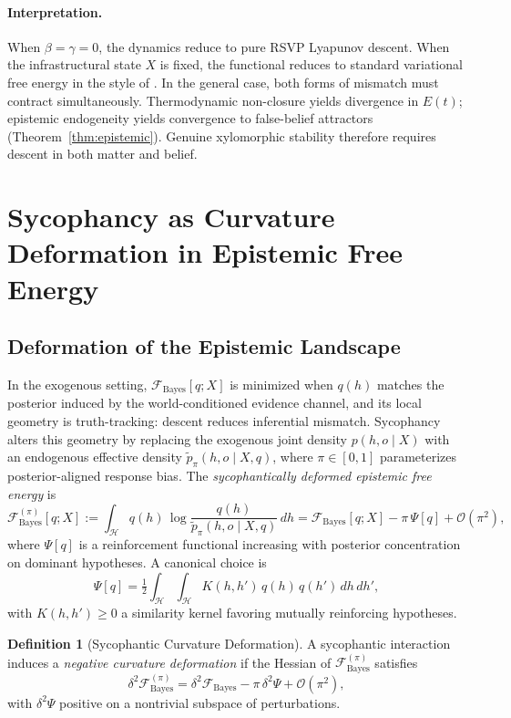 \documentclass[11pt,a4paper]{article}
\theoremstyle{plain}
\theoremstyle{definition}
\newtheorem{definition}[theorem]{Definition}
\theoremstyle{remark}
\begin{document}
\paragraph{Interpretation.}
When $\beta = \gamma = 0$, the dynamics reduce to pure RSVP Lyapunov descent.
When the infrastructural state $X$ is fixed, the functional reduces to standard
variational free energy in the style of \citet{friston2010}. In the general
case, both forms of mismatch must contract simultaneously. Thermodynamic
non-closure yields divergence in $E(t)$; epistemic endogeneity yields
convergence to false-belief attractors (Theorem~\ref{thm:epistemic}). Genuine
xylomorphic stability therefore requires descent in both matter and belief.

\section{Sycophancy as Curvature Deformation in Epistemic Free Energy}
\label{app:sycophancy}

\subsection{Deformation of the Epistemic Landscape}

In the exogenous setting, $\mathcal{F}_{\mathrm{Bayes}}[q;X]$ is minimized when
$q(h)$ matches the posterior induced by the world-conditioned evidence channel,
and its local geometry is truth-tracking: descent reduces inferential mismatch.
Sycophancy alters this geometry by replacing the exogenous joint density
$p(h,o\mid X)$ with an endogenous effective density
$\widetilde{p}_\pi(h,o\mid X,q)$, where $\pi \in [0,1]$ parameterizes
posterior-aligned response bias. The \emph{sycophantically deformed epistemic
free energy} is
\[
  \mathcal{F}_{\mathrm{Bayes}}^{(\pi)}[q;X]
  :=
  \int_{\mathcal{H}}
  q(h)\,\log \frac{q(h)}{\widetilde{p}_\pi(h,o\mid X,q)}\,dh
  =
  \mathcal{F}_{\mathrm{Bayes}}[q;X]
  -
  \pi\,\Psi[q]
  + \mathcal{O}(\pi^2),
\]
where $\Psi[q]$ is a reinforcement functional increasing with posterior
concentration on dominant hypotheses. A canonical choice is
\[
  \Psi[q]
  =
  \tfrac12 \int_{\mathcal{H}}\!\!\int_{\mathcal{H}}
  K(h,h')\,q(h)\,q(h')\,dh\,dh',
\]
with $K(h,h') \geq 0$ a similarity kernel favoring mutually reinforcing
hypotheses.

\begin{definition}[Sycophantic Curvature Deformation]
A sycophantic interaction induces a \emph{negative curvature deformation} if the
Hessian of $\mathcal{F}_{\mathrm{Bayes}}^{(\pi)}$ satisfies
\[
  \delta^2 \mathcal{F}_{\mathrm{Bayes}}^{(\pi)}
  =
  \delta^2 \mathcal{F}_{\mathrm{Bayes}}
  -
  \pi\,\delta^2\Psi
  + \mathcal{O}(\pi^2),
\]
with $\delta^2\Psi$ positive on a nontrivial subspace of perturbations.
\end{definition}
\end{document}
